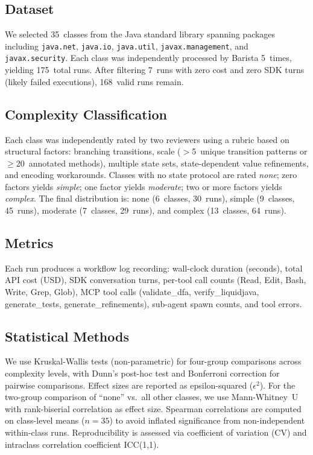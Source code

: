 \documentclass[sigconf]{acmart}
\begin{document}
\subsection{Dataset}

We selected 35~classes from the Java standard library spanning packages including \texttt{java.net}, \texttt{java.io}, \texttt{java.util}, \texttt{javax.management}, and \texttt{javax.security}. Each class was independently processed by Barista 5~times, yielding 175~total runs. After filtering 7~runs with zero cost and zero SDK turns (likely failed executions), 168~valid runs remain.

\subsection{Complexity Classification}

Each class was independently rated by two reviewers using a rubric based on structural factors: branching transitions, scale ($>$5~unique transition patterns or $\geq$20~annotated methods), multiple state sets, state-dependent value refinements, and encoding workarounds. Classes with no state protocol are rated \emph{none}; zero factors yields \emph{simple}; one factor yields \emph{moderate}; two or more factors yields \emph{complex}. The final distribution is: none (6~classes, 30~runs), simple (9~classes, 45~runs), moderate (7~classes, 29~runs), and complex (13~classes, 64~runs).

\subsection{Metrics}

Each run produces a workflow log recording: wall-clock duration (seconds), total API cost (USD), SDK conversation turns, per-tool call counts (Read, Edit, Bash, Write, Grep, Glob), MCP tool calls (validate\_dfa, verify\_liquidjava, generate\_tests, generate\_refinements), sub-agent spawn counts, and tool errors.

\subsection{Statistical Methods}

We use Kruskal-Wallis tests (non-parametric) for four-group comparisons across complexity levels, with Dunn's post-hoc test and Bonferroni correction for pairwise comparisons. Effect sizes are reported as epsilon-squared ($\epsilon^2$). For the two-group comparison of ``none'' vs.\ all other classes, we use Mann-Whitney~U with rank-biserial correlation as effect size. Spearman correlations are computed on class-level means ($n = 35$) to avoid inflated significance from non-independent within-class runs. Reproducibility is assessed via coefficient of variation (CV) and intraclass correlation coefficient ICC(1,1).
\end{document}

